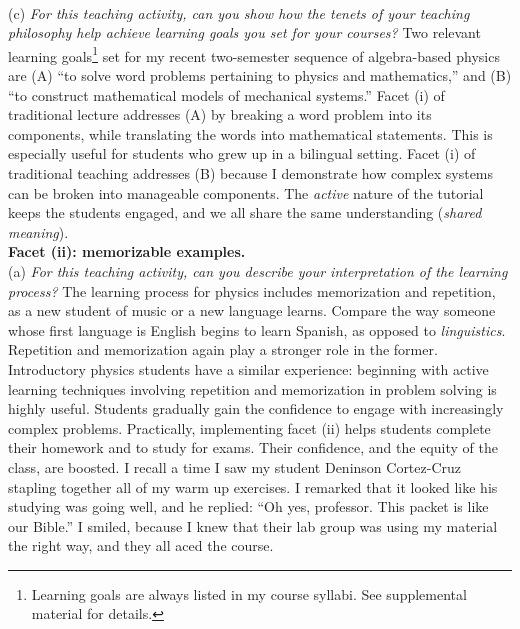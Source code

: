 \documentclass[../../../main.tex]{subfiles}
\begin{document}
\\
\vspace{0.15cm}
(c) \textit{For this teaching activity, can you show how the tenets of your teaching philosophy help achieve learning goals you set for your courses?} Two relevant learning goals\footnote{Learning goals are always listed in my course syllabi.  See supplemental material for details.} set for my recent two-semester sequence of algebra-based physics are (A) ``to solve word problems pertaining to physics and mathematics,'' and (B) ``to construct mathematical models of mechanical systems.''  Facet (i) of traditional lecture addresses (A) by breaking a word problem into its components, while translating the words into mathematical statements.  This is especially useful for students who grew up in a bilingual setting.  Facet (i) of traditional teaching addresses (B) because I demonstrate how complex systems can be broken into manageable components.  The \textit{active} nature of the tutorial keeps the students engaged, and we all share the same understanding (\textit{shared meaning}).
\\
\vspace{0.15cm}
\textbf{Facet (ii): memorizable examples.}
\\
\vspace{0.15cm}
(a) \textit{For this teaching activity, can you describe your interpretation of the learning process?}  The learning process for physics includes memorization and repetition, as a new student of music or a new language learns.  Compare the way someone whose first language is English begins to learn Spanish, as opposed to \textit{linguistics}.  Repetition and memorization again play a stronger role in the former.  Introductory physics students have a similar experience: beginning with active learning techniques involving repetition and memorization in problem solving is highly useful.  Students gradually gain the confidence to engage with increasingly complex problems.  Practically, implementing facet (ii) helps students complete their homework and to study for exams.  Their confidence, and the equity of the class, are boosted.  I recall a time I saw my student Deninson Cortez-Cruz stapling together all of my warm up exercises.  I remarked that it looked like his studying was going well, and he replied: ``Oh yes, professor.  This packet is like our Bible.''  I smiled, because I knew that their lab group was using my material the right way, and they all aced the course.
\\
\vspace{0.15cm}
\end{document}
